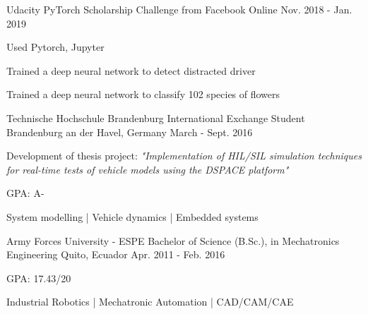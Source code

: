 
\begin{cventries}

  \cventry
    {Udacity}
    {PyTorch Scholarship Challenge from Facebook}
    {Online}
    {Nov. 2018 - Jan. 2019}
    {
      \begin{cvitems}
        \item {Used Pytorch, Jupyter}
        \item {Trained a deep neural network to detect distracted driver}
        \item {Trained a deep neural network to classify 102 species of flowers}
      \end{cvitems}
    }

  \cventry
    {Technische Hochschule Brandenburg}
    {International Exchange Student}
    {Brandenburg an der Havel, Germany}
    {March - Sept. 2016}
    {
      \begin{cvitems}
        \item {Development of thesis project: \textit{"Implementation of HIL/SIL simulation techniques for real-time tests of vehicle models using the DSPACE platform"}}
        \item {GPA: A-}
        \item {System modelling  |  Vehicle dynamics  |  Embedded systems}
      \end{cvitems}
    }

  \cventry
    {Army Forces University - ESPE}
    {Bachelor of Science (B.Sc.), in Mechatronics Engineering}
    {Quito, Ecuador}
    {Apr. 2011 - Feb. 2016}
    {
      \begin{cvitems}
        \item {GPA: 17.43/20}
        \item {Industrial Robotics  |  Mechatronic Automation  |  CAD/CAM/CAE}
      \end{cvitems}
    }
    
    
\end{cventries}

